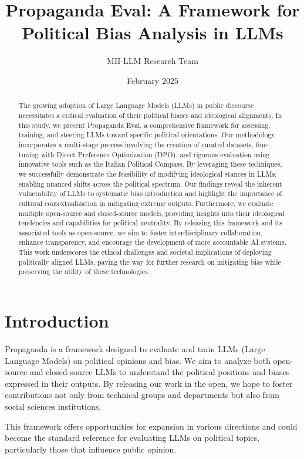 \documentclass{article}
\title{Propaganda Eval: A Framework for Political Bias Analysis in LLMs}
\author{MII-LLM Research Team}
\date{February 2025}
\begin{document}
\maketitle

\begin{abstract}
The growing adoption of Large Language Models (LLMs) in public discourse necessitates a critical evaluation of their political biases and ideological alignments. In this study, we present Propaganda Eval, a comprehensive framework for assessing, training, and steering LLMs toward specific political orientations. Our methodology incorporates a multi-stage process involving the creation of curated datasets, fine-tuning with Direct Preference Optimization (DPO), and rigorous evaluation using innovative tools such as the Italian Political Compass. By leveraging these techniques, we successfully demonstrate the feasibility of modifying ideological stances in LLMs, enabling nuanced shifts across the political spectrum. Our findings reveal the inherent vulnerability of LLMs to systematic bias introduction and highlight the importance of cultural contextualization in mitigating extreme outputs. Furthermore, we evaluate multiple open-source and closed-source models, providing insights into their ideological tendencies and capabilities for political neutrality. By releasing this framework and its associated tools as open-source, we aim to foster interdisciplinary collaboration, enhance transparency, and encourage the development of more accountable AI systems. This work underscores the ethical challenges and societal implications of deploying politically aligned LLMs, paving the way for further research on mitigating bias while preserving the utility of these technologies.
\end{abstract}
\newpage
\section{Introduction}
Propaganda is a framework designed to evaluate and train LLMs (Large Language Models) on political opinions and bias. We aim to analyze both open-source and closed-source LLMs to understand the political positions and biases expressed in their outputs. By releasing our work in the open, we hope to foster contributions not only from technical groups and departments but also from social sciences institutions.

This framework offers opportunities for expansion in various directions and could become the standard reference for evaluating LLMs on political topics, particularly those that influence public opinion.
\end{document}
